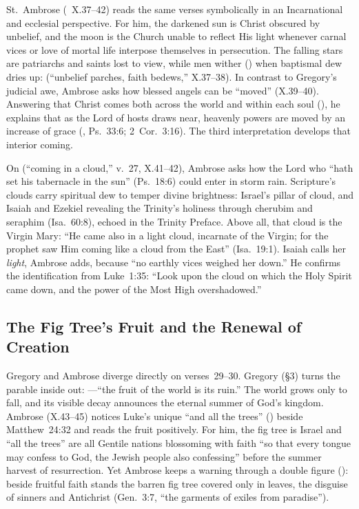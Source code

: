 St.~Ambrose (~X.37--42) reads the same verses symbolically in an Incarnational and ecclesial perspective. For him, the darkened sun is Christ obscured by unbelief, and the moon is the Church unable to reflect His light whenever carnal vices or love of mortal life interpose themselves in persecution. The falling stars are patriarchs and saints lost to view, while men wither () when baptismal dew dries up:  (``unbelief parches, faith bedews,'' X.37--38). In contrast to Gregory's judicial awe, Ambrose asks how blessed angels can be ``moved'' (X.39--40). Answering that Christ comes both across the world and within each soul (), he explains that as the Lord of hosts draws near, heavenly powers are moved by an increase of grace (, Ps.~33:6; 2~Cor.~3:16). The third interpretation develops that interior coming.

On  (``coming in a cloud,'' v.~27, X.41--42), Ambrose asks how the Lord who ``hath set his tabernacle in the sun'' (Ps.~18:6) could enter in storm rain. Scripture's clouds carry spiritual dew to temper divine brightness: Israel's pillar of cloud, and Isaiah and Ezekiel revealing the Trinity's holiness through cherubim and seraphim (Isa.~60:8), echoed in the Trinity Preface. Above all, that cloud is the Virgin Mary: ``He came also in a light cloud, incarnate of the Virgin; for the prophet saw Him coming like a cloud from the East'' (Isa.~19:1). Isaiah calls her \emph{light}, Ambrose adds, because ``no earthly vices weighed her down.'' He confirms the identification from Luke~1:35: ``Look upon the cloud on which the Holy Spirit came down, and the power of the Most High overshadowed.''

\subsection{The Fig Tree's Fruit and the Renewal of Creation}

Gregory and Ambrose diverge directly on verses~29--30. Gregory (\S3) turns the parable inside out: ---``the fruit of the world is its ruin.'' The world grows only to fall, and its visible decay announces the eternal summer of God's kingdom. Ambrose (X.43--45) notices Luke's unique ``and all the trees'' () beside Matthew~24:32 and reads the fruit positively. For him, the fig tree is Israel and ``all the trees'' are all Gentile nations blossoming with faith ``so that every tongue may confess to God, the Jewish people also confessing'' before the summer harvest of resurrection. Yet Ambrose keeps a warning through a double figure (): beside fruitful faith stands the barren fig tree covered only in leaves, the disguise of sinners and Antichrist (Gen.~3:7, ``the garments of exiles from paradise'').

